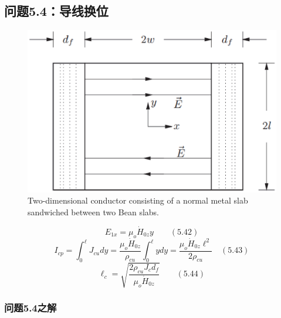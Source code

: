 \subsection{问题5.4：导线换位}


\begin{figure}
	\centering
	\includegraphics[scale=0.6]{chpt5/figs/fig5.20.eps}
	\caption{Two-dimensional conductor consisting of a normal
		metal slab sandwiched between two Bean slabs.}
\end{figure}



\begin{equation}%
E_{1x}=\mu_{o}\dot{H}_{0z}y\qquad(5.42)
\end{equation}
\begin{equation}%
I_{cp}=\int_{0}^{\ell}J_{cu}dy=\frac{\mu_{o}\dot{H}_{0z}}{\rho_{cu}}\int_{0}^{\ell}ydy=\frac{\mu_{o}\dot{H}_{0z}\ell^{2}}{2\rho_{cu}}\quad(5.43)
\end{equation}
\begin{equation}%
\ell_{c}=\sqrt{\frac{2\rho_{cu}J_{c}d_{f}}{\mu_{o}\dot{H}_{0z}}}\qquad(5.44)
\end{equation}


\subsubsection{问题5.4之解}

